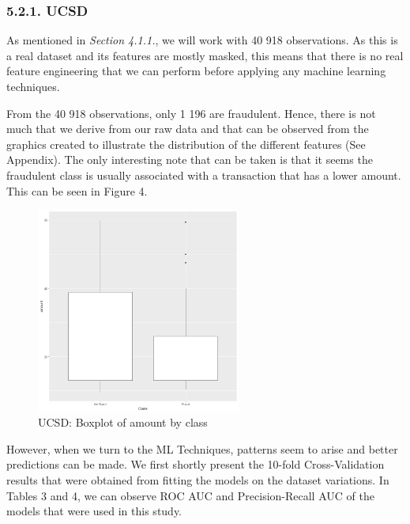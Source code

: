 \documentclass[12pt,]{article}
\begin{document}
\hypertarget{ucsd}{%
\subsubsection{5.2.1. UCSD}\label{ucsd}}

As mentioned in \emph{Section 4.1.1.}, we will work with 40 918
observations. As this is a real dataset and its features are mostly
masked, this means that there is no real feature engineering that we can
perform before applying any machine learning techniques.

From the 40 918 observations, only 1 196 are fraudulent. Hence, there is
not much that we derive from our raw data and that can be observed from
the graphics created to illustrate the distribution of the different
features (See Appendix). The only interesting note that can be taken is
that it seems the fraudulent class is usually associated with a
transaction that has a lower amount. This can be seen in Figure 4.

\begin{figure}
\centering
\includegraphics[width=0.6\textwidth,height=\textheight]{figures/ucsd/descriptive/boxplot_amount.png}
\caption{UCSD: Boxplot of amount by class}
\end{figure}

However, when we turn to the ML Techniques, patterns seem to arise and
better predictions can be made. We first shortly present the 10-fold
Cross-Validation results that were obtained from fitting the models on
the dataset variations. In Tables 3 and 4, we can observe ROC AUC and
Precision-Recall AUC of the models that were used in this study.
\end{document}
